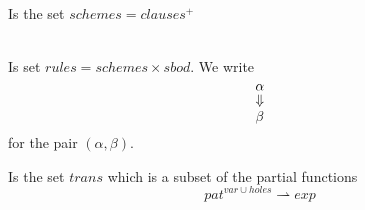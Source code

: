 \begin{definition}[Schemes] \ \\
  Is the set $schemes = clauses^{+}$
\end{definition}

\begin{definition} \ \\
  Is set $rules = schemes \times sbod$. We write
  \[
  \shortstack[ccc]{$\alpha$ \\ $\Downarrow$ \\ $\beta$}
  \]
  for the pair $(\alpha, \beta)$.
\end{definition}

\begin{definition}[Transformers]
  Is the set $trans$ which is a subset of the partial functions
  \[
  pat^{var \cup holes} \rightharpoonup exp
  \]
\end{definition}

